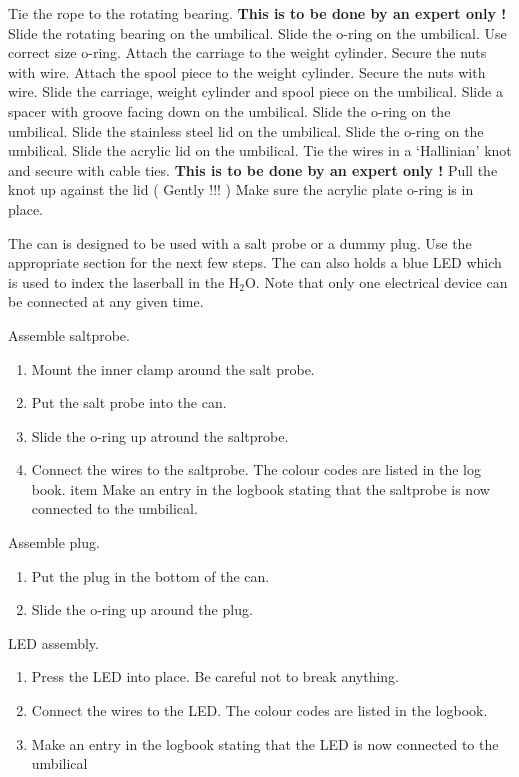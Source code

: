 \begin{enumerate}
\checkitem Tie the rope to the rotating bearing. {\bf This is to be done by an expert only !}
\checkitem Slide the rotating bearing on the umbilical.
\checkitem Slide the o-ring on the umbilical. Use correct size o-ring.
\checkitem Attach the carriage to the weight cylinder. Secure the nuts with wire.
\checkitem Attach the spool piece to the weight cylinder. Secure the nuts with wire.
\checkitem Slide the carriage, weight cylinder and spool piece  on the umbilical.
\checkitem Slide a spacer with groove facing down on the umbilical.
\checkitem Slide the o-ring on the umbilical.
\checkitem Slide the stainless steel lid on the umbilical.
\checkitem Slide the o-ring on the umbilical.
\checkitem Slide the acrylic lid on the umbilical.
\checkitem Tie the wires in a  `Hallinian' knot and secure with cable ties. {\bf This is to
be done by an expert only !}
\checkitem Pull the knot up against the lid ( Gently !!! )
\checkitem Make sure the acrylic plate o-ring is in place.

     The can is designed to be used with a salt probe or a dummy plug. Use the
appropriate section for the next few steps. The can also holds a blue LED which
is used to index the laserball in the H$_2$O. Note that only one electrical
device can be connected at any given time. 

\checkitem Assemble saltprobe.
\begin{enumerate}

\item Mount the inner clamp around the salt probe.
\item Put the salt probe into the can.
\item Slide the o-ring up atround the saltprobe.
\item Connect the wires to the saltprobe. The colour codes are listed in the log book.
item Make an entry in the logbook stating that the saltprobe is now connected to the umbilical.
\end{enumerate}

\checkitem Assemble plug.
\begin{enumerate}
\item Put the plug in the bottom of the can.
\item Slide the o-ring up around the plug.
\end{enumerate}

\checkitem LED assembly.
\begin{enumerate}
\item Press the LED into place. Be careful not to break anything.
\item Connect the wires to the LED. The colour codes are listed in the logbook.
\item Make an entry in the logbook stating that the LED is now connected to the umbilical
\end{enumerate}


\end{enumerate}
